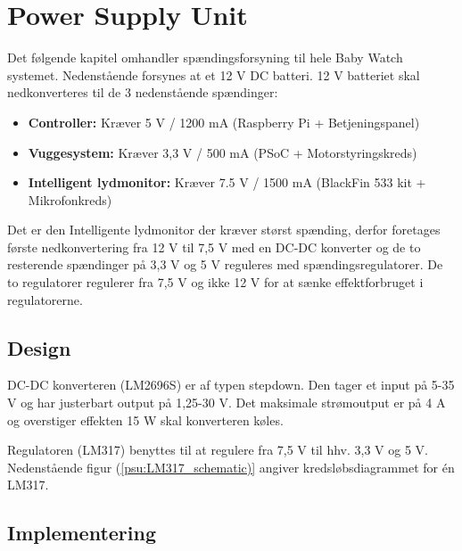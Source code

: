 \chapter{Power Supply Unit}

Det følgende kapitel omhandler spændingsforsyning til hele Baby Watch systemet. Nedenstående forsynes at et 12 V DC batteri. 12 V batteriet skal nedkonverteres til de 3 nedenstående spændinger: 
\begin{itemize}
\item \textbf{Controller:} Kræver 5 V / 1200 mA (Raspberry Pi + Betjeningspanel)

\item \textbf{Vuggesystem:} Kræver 3,3 V / 500 mA (PSoC + Motorstyringskreds)

\item \textbf{Intelligent lydmonitor:} Kræver 7.5 V / 1500 mA (BlackFin 533 kit + Mikrofonkreds)
\end{itemize}

Det er den Intelligente lydmonitor der kræver størst spænding, derfor foretages første nedkonvertering fra 12 V til 7,5 V med en DC-DC konverter og de to resterende spændinger på 3,3 V og 5 V reguleres med spændingsregulatorer. De to regulatorer regulerer fra 7,5 V og ikke 12 V for at sænke effektforbruget i regulatorerne. 

\section{Design}

DC-DC konverteren (LM2696S) er af typen stepdown. Den tager et input på 5-35 V og har justerbart output på 1,25-30 V. Det maksimale strømoutput er på 4 A og overstiger effekten 15 W skal konverteren køles. 

Regulatoren (LM317) benyttes til at regulere fra 7,5 V til hhv. 3,3 V og 5 V. Nedenstående figur (\ref{psu:LM317_schematic)} angiver kredsløbsdiagrammet for én LM317.






\section{Implementering}